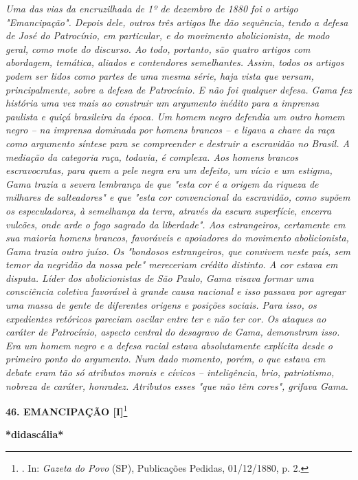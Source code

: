 \emph{Uma das vias da encruzilhada de 1º de dezembro de 1880 foi o
artigo "Emancipação". Depois dele, outros três artigos lhe dão
sequência, tendo a defesa de José do Patrocínio, em particular, e do
movimento abolicionista, de modo geral, como mote do discurso. Ao todo,
portanto, são quatro artigos com abordagem, temática, aliados e
contendores semelhantes. Assim, todos os artigos podem ser lidos como
partes de uma mesma série, haja vista que versam, principalmente, sobre
a defesa de Patrocínio. E não foi qualquer defesa. Gama fez história uma
vez mais ao construir um argumento inédito para a imprensa paulista e
quiçá brasileira da época. Um homem negro defendia um outro homem negro
-- na imprensa dominada por homens brancos -- e ligava a chave da raça
como argumento síntese para se compreender e destruir a escravidão no
Brasil. A mediação da categoria raça, todavia, é complexa. Aos homens
brancos escravocratas, para quem a pele negra era um defeito, um vício e
um estigma, Gama trazia a severa lembrança de que "esta cor é a origem
da riqueza de milhares de salteadores" e que "esta cor convencional da
escravidão, como supõem os especuladores, à semelhança da terra, através
da escura superfície, encerra vulcões, onde arde o fogo sagrado da
liberdade". Aos estrangeiros, certamente em sua maioria homens brancos,
favoráveis e apoiadores do movimento abolicionista, Gama trazia outro
juízo. Os "bondosos estrangeiros, que convivem neste país, sem temor da
negridão da nossa pele" mereceriam crédito distinto. A cor estava em
disputa. Líder dos abolicionistas de São Paulo, Gama visava formar uma
consciência coletiva favorável à grande causa nacional e isso passava
por agregar uma massa de gente de diferentes origens e posições sociais.
Para isso, os expedientes retóricos pareciam oscilar entre ter e não ter
cor. Os ataques ao caráter de Patrocínio, aspecto central do desagravo
de Gama, demonstram isso. Era um homem negro e a defesa racial estava
absolutamente explícita desde o primeiro ponto do argumento. Num dado
momento, porém, o que estava em debate eram tão só atributos morais e
cívicos -- inteligência, brio, patriotismo, nobreza de caráter,
honradez. Atributos esses "que não têm cores", grifava Gama.}

\textbf{46. EMANCIPAÇÃO {[}I{]}}\footnote{. In: \emph{Gazeta do Povo}
  (SP), Publicações Pedidas, 01/12/1880, p. 2.}

\textbf{*didascália*}

